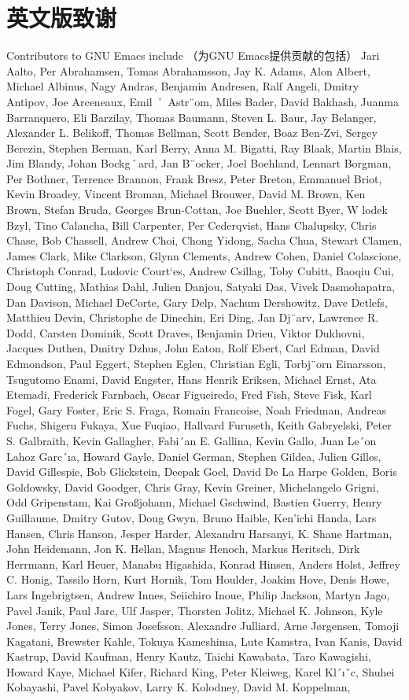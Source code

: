 \section{英文版致谢}
Contributors to GNU Emacs include （为GNU Emacs提供贡献的包括） Jari Aalto, Per Abrahamsen, Tomas Abrahamsson, Jay K. Adams, Alon Albert, Michael Albinus, Nagy Andras, Benjamin Andresen, Ralf Angeli, Dmitry Antipov, Joe Arceneaux, Emil ˚ Astr¨om, Miles Bader, David Bakhash, Juanma Barranquero, Eli Barzilay, Thomas Baumann, Steven L. Baur, Jay Belanger, Alexander L. Belikoff, Thomas Bellman, Scott Bender, Boaz Ben-Zvi, Sergey Berezin, Stephen Berman, Karl Berry, Anna M. Bigatti, Ray Blaak, Martin Blais, Jim Blandy, Johan Bockg˚ard, Jan B¨ocker, Joel Boehland, Lennart Borgman, Per Bothner, Terrence Brannon, Frank Bresz, Peter Breton, Emmanuel Briot, Kevin Broadey, Vincent Broman, Michael Brouwer, David M. Brown, Ken Brown, Stefan Bruda, Georges Brun-Cottan, Joe Buehler, Scott Byer, W lodek Bzyl, Tino Calancha, Bill Carpenter, Per Cederqvist, Hans Chalupsky, Chris Chase, Bob Chassell, Andrew Choi, Chong Yidong, Sacha Chua, Stewart Clamen, James Clark, Mike Clarkson, Glynn Clements, Andrew Cohen, Daniel Colascione, Christoph Conrad, Ludovic Court`es, Andrew Csillag, Toby Cubitt, Baoqiu Cui, Doug Cutting, Mathias Dahl, Julien Danjou, Satyaki Das, Vivek Dasmohapatra, Dan Davison, Michael DeCorte, Gary Delp, Nachum Dershowitz, Dave Detlefs, Matthieu Devin, Christophe de Dinechin, Eri Ding, Jan Dj¨arv, Lawrence R. Dodd, Carsten Dominik, Scott Draves, Benjamin Drieu, Viktor Dukhovni, Jacques Duthen, Dmitry Dzhus, John Eaton, Rolf Ebert, Carl Edman, David Edmondson, Paul Eggert, Stephen Eglen, Christian Egli, Torbj¨orn Einarsson, Tsugutomo Enami, David Engster, Hans Henrik Eriksen, Michael Ernst, Ata Etemadi, Frederick Farnbach, Oscar Figueiredo, Fred Fish, Steve Fisk, Karl Fogel, Gary Foster, Eric S. Fraga, Romain Francoise, Noah Friedman, Andreas Fuchs, Shigeru Fukaya, Xue Fuqiao, Hallvard Furuseth, Keith Gabryelski, Peter S. Galbraith, Kevin Gallagher, Fabi´an E. Gallina, Kevin Gallo, Juan Le´on Lahoz Garc´ıa, Howard Gayle, Daniel German, Stephen Gildea, Julien Gilles, David Gillespie, Bob Glickstein, Deepak Goel, David De La Harpe Golden, Boris Goldowsky, David Goodger, Chris Gray, Kevin Greiner, Michelangelo Grigni, Odd Gripenstam, Kai Großjohann, Michael Gschwind, Bastien Guerry, Henry Guillaume, Dmitry Gutov, Doug Gwyn, Bruno Haible, Ken’ichi Handa, Lars Hansen, Chris Hanson, Jesper Harder, Alexandru Harsanyi, K. Shane Hartman, John Heidemann, Jon K. Hellan, Magnus Henoch, Markus Heritsch, Dirk Herrmann, Karl Heuer, Manabu Higashida, Konrad Hinsen, Anders Holst, Jeffrey C. Honig, Tassilo Horn, Kurt Hornik, Tom Houlder, Joakim Hove, Denis Howe, Lars Ingebrigtsen, Andrew Innes, Seiichiro Inoue, Philip Jackson, Martyn Jago, Pavel Janik, Paul Jarc, Ulf Jasper, Thorsten Jolitz, Michael K. Johnson, Kyle Jones, Terry Jones, Simon Josefsson, Alexandre Julliard, Arne Jørgensen, Tomoji Kagatani, Brewster Kahle, Tokuya Kameshima, Lute Kamstra, Ivan Kanis, David Kastrup, David Kaufman, Henry Kautz, Taichi Kawabata, Taro Kawagishi, Howard Kaye, Michael Kifer, Richard King, Peter Kleiweg, Karel Kl´ıˇc, Shuhei Kobayashi, Pavel Kobyakov, Larry K. Kolodney, David M. Koppelman, 